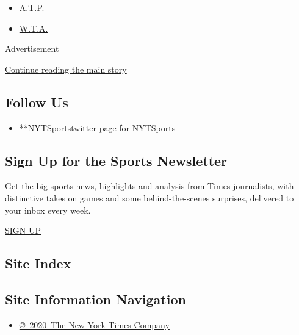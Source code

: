 \begin{itemize}
\tightlist
\item
  \protect\hyperlink{}{A.T.P.}
\item
  \protect\hyperlink{}{W.T.A.}
\end{itemize}

Advertisement

\protect\hyperlink{after-mktg}{Continue reading the main story}

\hypertarget{follow-us}{%
\subsection{Follow Us}\label{follow-us}}

\begin{itemize}
\tightlist
\item
  \href{https://twitter.com/NYTSports}{**NYTSportstwitter page for
  NYTSports}
\end{itemize}

\hypertarget{sign-up-for-the-sports-newsletter}{%
\subsection{Sign Up for the Sports
Newsletter}\label{sign-up-for-the-sports-newsletter}}

Get the big sports news, highlights and analysis from Times journalists,
with distinctive takes on games and some behind-the-scenes surprises,
delivered to your inbox every week.

\href{/newsletters/signup/SP}{SIGN UP}

\hypertarget{site-index}{%
\subsection{Site Index}\label{site-index}}

\hypertarget{site-information-navigation}{%
\subsection{Site Information
Navigation}\label{site-information-navigation}}

\begin{itemize}
\tightlist
\item
  \href{https://help.nytimes3xbfgragh.onion/hc/en-us/articles/115014792127-Copyright-notice}{©~2020~The
  New York Times Company}
\end{itemize}

